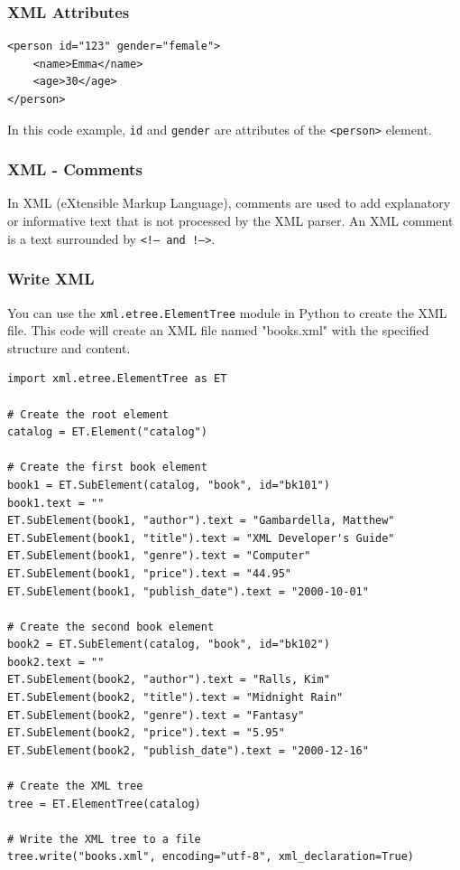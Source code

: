 \subsubsection{XML Attributes}
\begin{codebox}
\begin{verbatim}
<person id="123" gender="female">
    <name>Emma</name>
    <age>30</age>
</person>
\end{verbatim}
\end{codebox}

In this code example, \texttt{id} and \texttt{gender} are attributes of the \texttt{<person>} element.

\subsubsection{XML - Comments}
In XML (eXtensible Markup Language), comments are used to add explanatory or informative text that is not processed by the XML parser. An XML comment is a text surrounded by \texttt{<!-- and !-->}.

\newpage
\subsubsection{Write XML}
You can use the \texttt{xml.etree.ElementTree} module in Python to create the XML file. This code will create an XML file named "books.xml" with the specified structure and content.
\begin{codebox}
\begin{verbatim}
import xml.etree.ElementTree as ET

# Create the root element
catalog = ET.Element("catalog")

# Create the first book element
book1 = ET.SubElement(catalog, "book", id="bk101")
book1.text = ""
ET.SubElement(book1, "author").text = "Gambardella, Matthew"
ET.SubElement(book1, "title").text = "XML Developer's Guide"
ET.SubElement(book1, "genre").text = "Computer"
ET.SubElement(book1, "price").text = "44.95"
ET.SubElement(book1, "publish_date").text = "2000-10-01"

# Create the second book element
book2 = ET.SubElement(catalog, "book", id="bk102")
book2.text = ""
ET.SubElement(book2, "author").text = "Ralls, Kim"
ET.SubElement(book2, "title").text = "Midnight Rain"
ET.SubElement(book2, "genre").text = "Fantasy"
ET.SubElement(book2, "price").text = "5.95"
ET.SubElement(book2, "publish_date").text = "2000-12-16"

# Create the XML tree
tree = ET.ElementTree(catalog)

# Write the XML tree to a file
tree.write("books.xml", encoding="utf-8", xml_declaration=True)
\end{verbatim}
\end{codebox}

